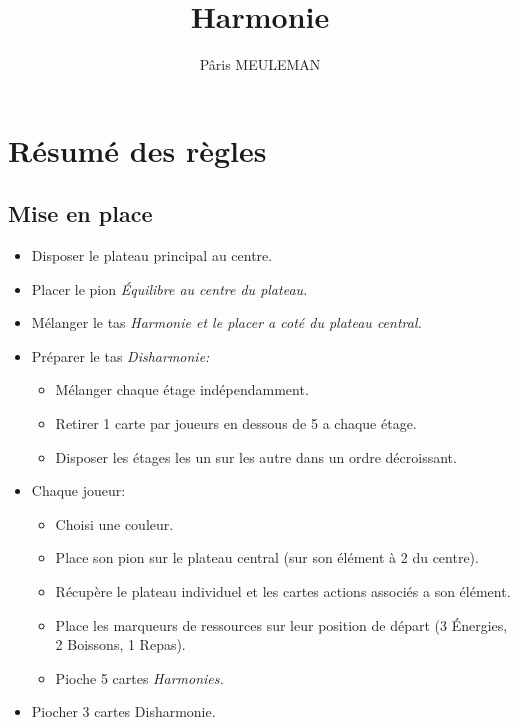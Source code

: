 \documentclass[a4paper]{article}
\newcommand{\harmonyInHand}{5 }
\newcommand{\distanceFromStart}{2 }
\newcommand{\startingDisharmonyDraw}{3 }
\newcommand{\removedDisharmoniesPerPlayer}{1 }
\newcommand{\startingEnergy}{3 }
\newcommand{\startingBeverage}{2 }
\newcommand{\startingMeal}{1 }
\begin{document}
\title{Harmonie}
\author{Pâris MEULEMAN}
\maketitle
\newpage
\tableofcontents
\newpage

\section{Résumé des règles}
\subsection{Mise en place}
	\begin{itemize}
		\item Disposer le plateau principal au centre.
		\item Placer le pion \em{Équilibre} au centre du plateau.
		\item Mélanger le tas \em{Harmonie} et le placer a coté du plateau central.
		\item Préparer le tas \em{Disharmonie}:
		\begin{itemize}
			\item Mélanger chaque étage indépendamment.
			\item Retirer \removedDisharmoniesPerPlayer carte par joueurs en dessous de 5 a chaque étage.
			\item Disposer les étages les un sur les autre dans un ordre décroissant.
		\end{itemize}
		\item Chaque joueur:
		\begin{itemize}
			\item Choisi une couleur.
			\item Place son pion sur le plateau central (sur son élément à \distanceFromStart du centre).
			\item Récupère le plateau individuel et les cartes actions associés a son élément.
			\item Place les marqueurs de ressources sur leur position de départ (\startingEnergy Énergies, \startingBeverage Boissons, \startingMeal Repas).
			\item Pioche \harmonyInHand cartes \em{Harmonies}.
		\end{itemize}
		\item Piocher \startingDisharmonyDraw cartes Disharmonie.
	\end{itemize}
\end{document}
